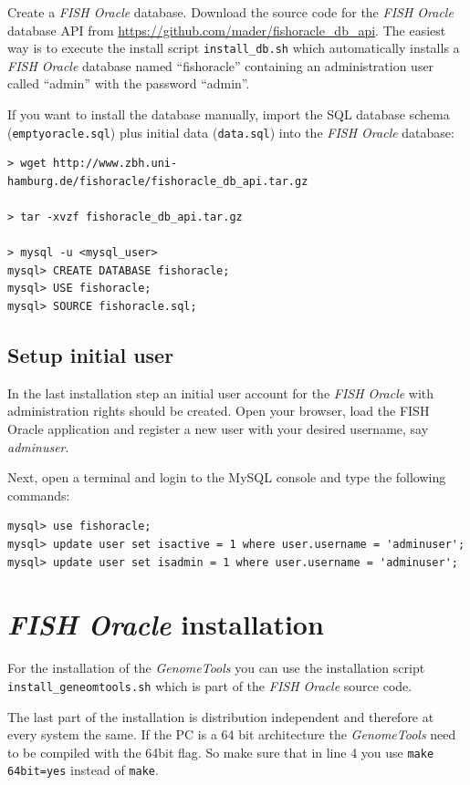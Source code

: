 \documentclass[11pt,final]{article}
\newcommand{\Gt}[0]{\emph{GenomeTools}\xspace}
\newcommand{\FO}[0]{\emph{FISH Oracle}\xspace}
\begin{document}
Create a \FO database. Download the source code for the \FO database API from
\url{https://github.com/mader/fishoracle_db_api}. The easiest way is to
execute the install script \texttt{install\_db.sh} which automatically
installs a \FO database named ``fishoracle'' containing an administration user
called ``admin'' with the password ``admin''.

If you want to install the database manually, import the SQL database schema
(\texttt{emptyoracle.sql}) plus initial data (\texttt{data.sql}) into the
\FO database:

\begin{lstlisting}
> wget http://www.zbh.uni-hamburg.de/fishoracle/fishoracle_db_api.tar.gz

> tar -xvzf fishoracle_db_api.tar.gz

> mysql -u <mysql_user>
mysql> CREATE DATABASE fishoracle;
mysql> USE fishoracle;
mysql> SOURCE fishoracle.sql;
\end{lstlisting}

\subsection{Setup initial user}

In the last installation step an initial user account for the \FO with
administration rights should be created. Open your browser, load the FISH
Oracle application and register a new user with your desired username, say
\emph{adminuser}. 

Next, open a terminal and login to the MySQL console and type the following
commands:

\begin{lstlisting}
mysql> use fishoracle;
mysql> update user set isactive = 1 where user.username = 'adminuser';
mysql> update user set isadmin = 1 where user.username = 'adminuser';
\end{lstlisting}

\section{\FO installation}
\label{fo-install}

For the installation of the \Gt you can use the installation script
\texttt{install\_geneomtools.sh} which is part of the \FO source code.

The last part of the installation is distribution independent
and therefore at every system the same. If the PC is a 64 bit
architecture the \Gt need to be compiled with the 64bit
flag. So make sure that in line 4 you use \texttt{make 64bit=yes}
instead of \texttt{make}.
\end{document}
